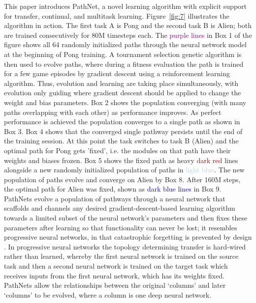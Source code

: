 \documentclass{sig-alternate-05-2015}
\begin{document}
This paper introduces PathNet, a novel learning algorithm with explicit support for transfer, continual, and multitask learning. Figure~\ref{fig:7} illustrates the algorithm in action. The first task A is Pong and the second task B is Alien; both are trained consecutively for 80M timesteps each. The \textcolor{purple}{purple lines} in Box 1 of the figure shows all 64 randomly initialized paths through the neural network model at the beginning of Pong training. A tournament selection genetic algorithm is then used to evolve paths, where during a fitness evaluation the path is trained for a few game episodes by gradient descent using a reinforcement learning algorithm. Thus, evolution and learning are taking place simultaneously, with evolution only guiding where gradient descent should be applied to change the weight and bias parameters. Box 2 shows the population converging (with many paths overlapping with each other) as performance improves. As perfect performance is achieved the population converges to a single path as shown in Box 3. Box 4 shows that the converged single pathway persists until the end of the training session. At this point the task switches to task B (Alien) and the optimal path for Pong gets 'fixed', i.e. the modules on that path have their weights and biases frozen. Box 5 shows the fixed path as heavy \textcolor{darkred}{dark red} lines alongside a new randomly initialized population of paths in \textcolor{lightblue}{light blue}. The new population of paths evolve and converge on Alien by Box 8. After 160M steps, the optimal path for Alien was fixed, shown as \textcolor{darkblue}{dark blue lines} in Box 9. \\

PathNets evolve a population of pathways through a neural network that scaffolds and channels any desired gradient-descent-based learning algorithm towards a limited subset of the neural network's parameters and then fixes these parameters after learning so that functionality can never be lost; it resembles progressive neural networks, in that catastrophic forgetting is prevented by design \cite{rusu2016progressive}. In progressive neural networks the topology determining transfer is hard-wired rather than learned, whereby the first neural network is trained on the source task and then a second neural network is trained on the target task which receives inputs from the first neural network, which has its weights fixed. PathNets allow the relationships between the original `columns' and later `columns' to be evolved, where a column is one deep neural network.\\
\end{document}
